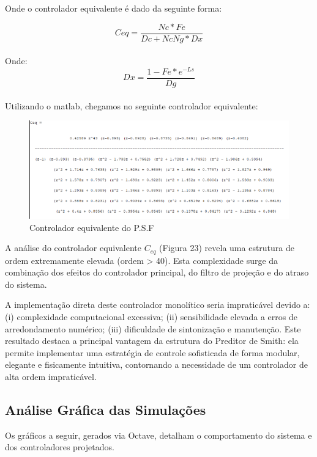 \documentclass[a4paper,12pt]{article}
\begin{document}
Onde o controlador equivalente é dado da seguinte forma:

\begin{equation} 
Ceq = \frac{Nc*Fe}{Dc+NcNg*Dx} 
\end{equation}\\
Onde:\\
\begin{equation} 
Dx = \frac{1-Fe*e^{-Ls}}{Dg}
\end{equation}\\

Utilizando o matlab, chegamos no seguinte controlador equivalente:

\begin{figure} [H]
    \centering
    \includegraphics[width=0.9\linewidth]{image11.png}
    \caption{Controlador equivalente do P.S.F}
    \label{fig:psf_equivalent_controller}
\end{figure}

A análise do controlador equivalente $C_{eq}$ (Figura 23) revela uma estrutura de ordem extremamente elevada (ordem > 40). Esta complexidade surge da combinação dos efeitos do controlador principal, do filtro de projeção e do atraso do sistema.

A implementação direta deste controlador monolítico seria impraticável devido a: (i) complexidade computacional excessiva; (ii) sensibilidade elevada a erros de arredondamento numérico; (iii) dificuldade de sintonização e manutenção. Este resultado destaca a principal vantagem da estrutura do Preditor de Smith: ela permite implementar uma estratégia de controle sofisticada de forma modular, elegante e fisicamente intuitiva, contornando a necessidade de um controlador de alta ordem impraticável.

\subsection{Análise Gráfica das Simulações}
Os gráficos a seguir, gerados via Octave, detalham o comportamento do sistema e dos controladores projetados.
\end{document}
